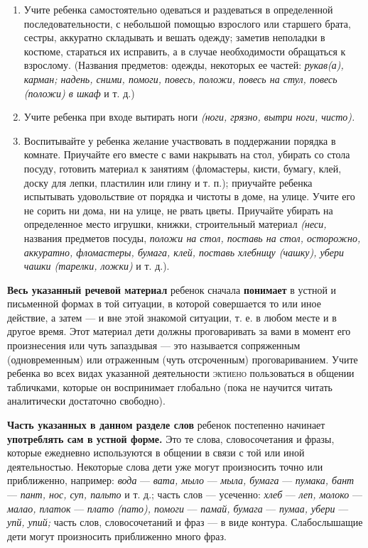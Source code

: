 \documentclass[a5paper]{book}
\renewcommand{\emph}[1]{\textit{#1}}
\begin{document}
\begin{enumerate}
\def\labelenumi{\arabic{enumi}.}
\setcounter{enumi}{5}
\item
  
  Учите ребенка самостоятельно одеваться и раздеваться в определенной
  последовательности, с небольшой помощью взрослого или старшего брата,
  сестры, аккуратно складывать и вешать одежду; заметив неполадки в
  костюме, стараться их исправить, а в случае необходимости обращаться к
  взрослому. (Названия предметов: одежды, некоторых ее частей:
  \emph{рукав(а), карман; надень, сними, помоги, повесь, положи, повесь
  на стул, повесь (положи) в шкаф} и т. д.)
  
\item
  
  Учите ребенка при входе вытирать ноги \emph{(ноги, грязно, вытри ноги,
  чисто).}
  
\item
  
  Воспитывайте у ребенка желание участвовать в поддержании порядка в
  комнате. Приучайте его вместе с вами накрывать на стол, убирать со
  стола посуду, готовить материал к занятиям (фломастеры, кисти, бумагу,
  клей, доску для лепки, пластилин или глину и т. п.); приучайте ребенка
  испытывать удовольствие от порядка и чистоты в доме, на улице. Учите
  его не сорить ни дома, ни на улице, не рвать цветы. Приучайте убирать
  на определенное место игрушки, книжки, строительный материал
  \emph{(неси,} названия предметов посуды, \emph{положи на стол, поставь
  на стол, осторожно, аккуратно, фломастеры, бумага, клей, поставь
  хлебницу (чашку), убери чашки (тарелки, ложки)} и т. д.).
  
\end{enumerate}


\textbf{Весь указанный речевой материал} ребенок сначала
\textbf{понимает} в устной и письменной формах в той ситуации, в которой
совершается то или иное действие, а затем --- и вне этой знакомой
ситуации, т. е. в любом месте и в другое время. Этот материал дети
должны проговаривать за вами в момент его произнесения или чуть
запаздывая --- это называется сопряженным (одновременным) или отраженным
(чуть отсроченным) проговариванием. Учите ребенка во всех видах
указанной деятельности \textsc{эктиено} пользоваться в общении
табличками, которые он воспринимает глобально (пока не научится читать
аналитически достаточно свободно).

\textbf{Часть указанных в данном разделе слов} ребенок постепенно
начинает \textbf{употреблять сам в устной форме.} Это те слова,
словосочетания и фразы, которые ежедневно используются в общении в связи
с той или иной деятельностью. Некоторые слова дети уже могут произносить
точно или приближенно, например: \emph{вода} --- \emph{вата, мыло} ---
\emph{мыла, бумага} --- \emph{пумака, бант} --- \emph{пант, нос, суп,
пальто} и т. д.; часть слов --- усеченно: \emph{хлеб} --- \emph{леп,
молоко} --- \emph{малао, платок} --- \emph{плато (пато), помоги} ---
\emph{памай, бумага} --- \emph{пумаа, убери} --- \emph{упй, упий;} часть
слов, словосочетаний и фраз --- в виде контура. Слабослышащие дети могут
произносить приближенно много фраз.
\end{document}
